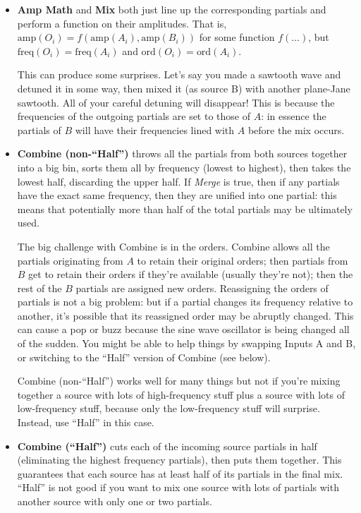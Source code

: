 \documentclass{article}
\begin{document}
\begin{itemize}
\item {\bf Amp Math} and {\bf Mix} both just line up the corresponding partials and perform a function on their amplitudes.  That is, \(\text{amp}(O_i) = f(\text{amp}(A_i), \text{amp}(B_i))\) for some function \(f(...)\), but \(\text{freq}(O_i) = \text{freq}(A_i)\) and  \(\text{ord}(O_i) = \text{ord}(A_i)\).  

This can produce some surprises.  Let's say you made a sawtooth wave and detuned it in some way, then mixed it (as source B) with another plane-Jane sawtooth.  All of your careful detuning will disappear!  This is because the frequencies of the outgoing partials are set to those of \(A\): in essence the partials of \(B\) will have their frequencies lined with \(A\) before the mix occurs.

\item {\bf Combine (non-``Half'')} throws all the partials from both sources together into a big bin, sorts them all by frequency (lowest to highest), then takes the lowest half, discarding the upper half.  If {\it Merge} is true, then if any partials have the exact same frequency, then they are unified into one partial: this means that potentially more than half of the total partials may be ultimately used.  

The big challenge with Combine is in the orders.  Combine allows all the partials originating from \(A\) to retain their original orders; then partials from \(B\) get to retain their orders if they're available (usually they're not); then the rest of the \(B\) partials are assigned new orders.  Reassigning the orders of partials is not a big problem: but if a partial changes its frequency relative to another, it's possible that its reassigned order may be abruptly changed.  This can cause a pop or buzz because the sine wave oscillator is being changed all of the sudden.  You might be able to help things by swapping Inputs A and B, or switching to the ``Half'' version of Combine (see below).

Combine (non-``Half'') works well for many things but not if you're mixing together a source with lots of high-frequency stuff plus a source with lots of low-frequency stuff, because only the low-frequency stuff will surprise.  Instead, use ``Half'' in this case. 

\item {\bf Combine (``Half'')} cuts each of the incoming source partials in half (eliminating the highest frequency partials), then puts them together. This guarantees that each source has at least half of its partials in the final mix.  ``Half'' is not good if you want to mix one source with lots of partials with another source with only one or two partials.


\end{itemize}
\end{document}
